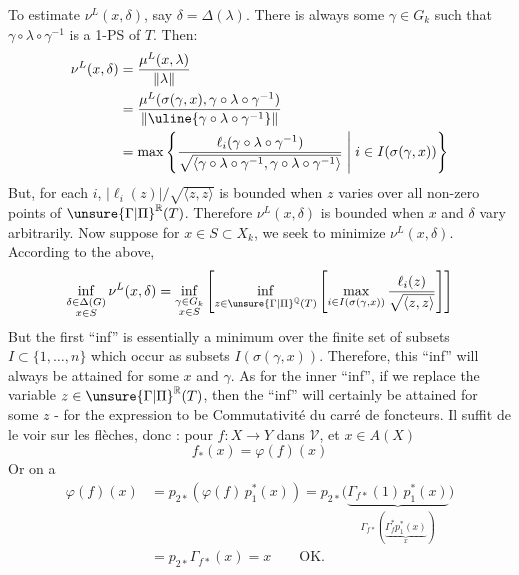 To estimate $\nu^L(x,\delta)$, say $\delta=\Delta(\lambda)$. There is always some $\gamma\in G_k$
such that $\gamma\circ\lambda\circ\gamma^{-1}$ is a 1-PS of $T$. Then:
\[
\begin{aligned}
\nu^L(x,\delta)&=\frac{\mu^L(x,\lambda)}{\Vert\lambda\Vert}\\
&=\frac{\mu^L(\sigma(\gamma,x),\gamma\circ\lambda\circ\gamma^{-1})}{\Vert\uline{\gamma\circ\lambda\circ\gamma^{-1}}\Vert}\\
&=\max\left\{\frac{\ell_i(\gamma\circ\lambda\circ\gamma^{-1})}{\sqrt{\langle\gamma\circ\lambda\circ\gamma^{-1},\gamma\circ\lambda\circ\gamma^{-1}\rangle}}\;\middle|\;i\in I(\sigma(\gamma,x))\right\}
\end{aligned}
\]
But, for each $i$, $|\ell_i(z)|/\sqrt{\langle z,z\rangle}$ is bounded when $z$ varies
over all non-zero points of $\unsure{\Gamma|\Pi}^{\mathbb R}(T)$. Therefore $\nu^L(x,\delta)$ is bounded
when $x$ and $\delta$ vary arbitrarily. Now suppose for $x\in S\subset X_k$, we seek
to minimize $\nu^L(x,\delta)$. According to the above,
\[
\inf_{\substack{\delta\in\Delta(G)\\x\in S}}\nu^L(x,\delta)
=\inf_{\substack{\gamma\in G_k\\x\in S}}\left[\inf_{z\in\unsure{\Gamma|\Pi}^{\mathbb Q}(T)}\left[\max_{i\in I(\sigma(\gamma,x))}\frac{\ell_i(z)}{\sqrt{\langle z,z\rangle}}\right]\right]
\]
But the first ``inf'' is essentially a minimum over the finite set of
subsets $I\subset\{1,\ldots,n\}$ which occur as subsets $I(\sigma(\gamma,x))$. Therefore,
this ``inf'' will always be attained for some $x$ and $\gamma$. As for the
inner ``inf'', if we replace the variable  $z\in\unsure{\Gamma|\Pi}^{\mathbb R}(T)$, then the ``inf''
will certainly be attained for some $z$ - for the expression to be
Commutativité du carré de foncteurs.
Il suffit de le voir sur les flèches, donc : 
pour $f:X\longrightarrow Y$ dans $\mathcal V$, et $x\in A(X)$
\[
f_*(x)=\varphi(f)(x)
\]
Or on a
\[
\begin{aligned}
\varphi(f)(x)&=p_{2*}(\varphi(f)\,p_1^*(x))
=p_{2*}\bigl(\underbrace{\Gamma_{f*}(1)\,p_1^*(x)}_{\Gamma_{f*}(\underbrace{\Gamma_f^*p_1^*(x)}_x)}\bigr)\\
&=p_{2*}\Gamma_{f*}(x)=x\qquad\mathrm{OK}.
\end{aligned}
\]

